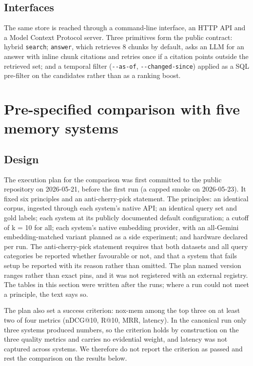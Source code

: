 \documentclass[a4paper,fleqn]{cas-sc}
\begin{document}
\subsection{Interfaces}

The same store is reached through a command-line interface, an HTTP API and a Model Context Protocol server. Three primitives form the public contract: hybrid \texttt{search}; \texttt{answer}, which retrieves 8 chunks by default, asks an LLM for an answer with inline chunk citations and retries once if a citation points outside the retrieved set; and a temporal filter (\texttt{-\/-as-of}, \texttt{-\/-changed-since}) applied as a SQL pre-filter on the candidates rather than as a ranking boost.

\section{Pre-specified comparison with five memory systems}

\subsection{Design}

The execution plan for the comparison was first committed to the public repository on 2026-05-21, before the first run (a capped smoke on 2026-05-23). It fixed six principles and an anti-cherry-pick statement. The principles: an identical corpus, ingested through each system's native API; an identical query set and gold labels; each system at its publicly documented default configuration; a cutoff of k = 10 for all; each system's native embedding provider, with an all-Gemini embedding-matched variant planned as a side experiment; and hardware declared per run. The anti-cherry-pick statement requires that both datasets and all query categories be reported whether favourable or not, and that a system that fails setup be reported with its reason rather than omitted. The plan named version ranges rather than exact pins, and it was not registered with an external registry. The tables in this section were written after the runs; where a run could not meet a principle, the text says so.

The plan also set a success criterion: nox-mem among the top three on at least two of four metrics (nDCG@10, R@10, MRR, latency). In the canonical run only three systems produced numbers, so the criterion holds by construction on the three quality metrics and carries no evidential weight, and latency was not captured across systems. We therefore do not report the criterion as passed and rest the comparison on the results below.
\end{document}
